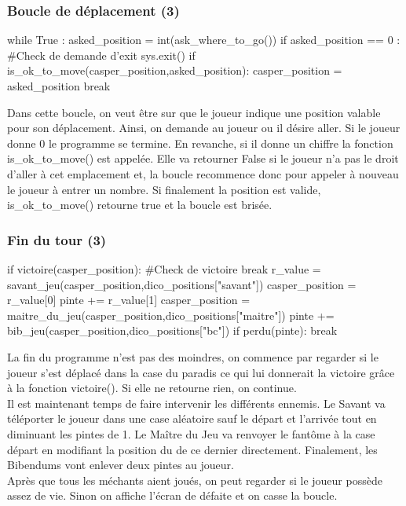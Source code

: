 \documentclass[titlepage]{report}
\begin{document}
{\subsubsection{Boucle de déplacement (3)}
\begin{python}
        while True :
            asked_position = int(ask_where_to_go())
            if asked_position == 0 : #Check de demande d'exit
                sys.exit()
            if  is_ok_to_move(casper_position,asked_position):
                casper_position = asked_position
                break
\end{python}
\vspace*{0.5cm}
\hspace*{0.5cm}Dans cette boucle, on veut être sur que le joueur indique une position valable pour son déplacement. Ainsi, on demande au joueur ou il désire aller. Si le joueur donne 0 le programme se termine. En revanche, si il donne un chiffre la fonction is\_ok\_to\_move() est appelée. Elle va retourner False si le joueur n'a pas le droit d'aller à cet emplacement et, la boucle recommence donc pour appeler à nouveau le joueur à entrer un nombre. Si finalement la position est valide, is\_ok\_to\_move() retourne true et la boucle est brisée. 

\subsubsection{Fin du tour (3)}
\begin{python}
        if victoire(casper_position): #Check de   victoire 
            break
        r_value = savant_jeu(casper_position,dico_positions["savant"])
        casper_position = r_value[0]
        pinte += r_value[1]
        casper_position = maitre_du_jeu(casper_position,dico_positions["maitre"]) 
        pinte += bib_jeu(casper_position,dico_positions["bc"])
        if perdu(pinte):
            break
\end{python}
\vspace*{0.5cm}
\hspace*{0.5cm}La fin du programme n'est pas des moindres, on commence par regarder si le joueur s'est déplacé dans la case du paradis ce qui lui donnerait la victoire grâce à la fonction victoire(). Si elle ne retourne rien, on continue.\\
\hspace*{0.5cm}Il est maintenant temps de faire intervenir les différents ennemis. Le Savant va téléporter le joueur dans une case aléatoire sauf le départ et l'arrivée tout en diminuant les pintes de 1. Le Maître du Jeu va renvoyer le fantôme à la case départ en modifiant la position du de ce dernier directement. Finalement, les Bibendums vont enlever deux pintes au joueur. \\
\hspace*{0.5cm}Après que tous les méchants aient joués, on peut regarder si le joueur possède assez de vie. Sinon on affiche l'écran de défaite et on casse la boucle.\\

}
\end{document}
